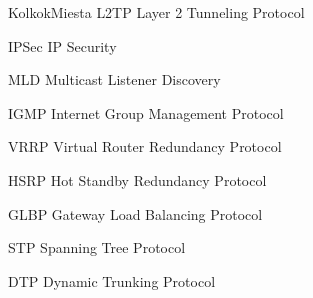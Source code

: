 \begin{seznamzkratek}{KolkokMiesta}
	{L2TP} %
	{Layer 2 Tunneling Protocol} %
	
	{IPSec} %
	{IP Security} %

	{MLD} %
	{Multicast Listener Discovery} %
	
	{IGMP} %
	{Internet Group Management Protocol} %
	
	{VRRP} %
	{Virtual Router Redundancy Protocol} %

	{HSRP} %
	{Hot Standby Redundancy Protocol} %
	
	{GLBP} %
	{Gateway Load Balancing Protocol} %
	
	{STP} %
	{Spanning Tree Protocol} %

	{DTP} %
	{Dynamic Trunking Protocol} %

\end{seznamzkratek}
